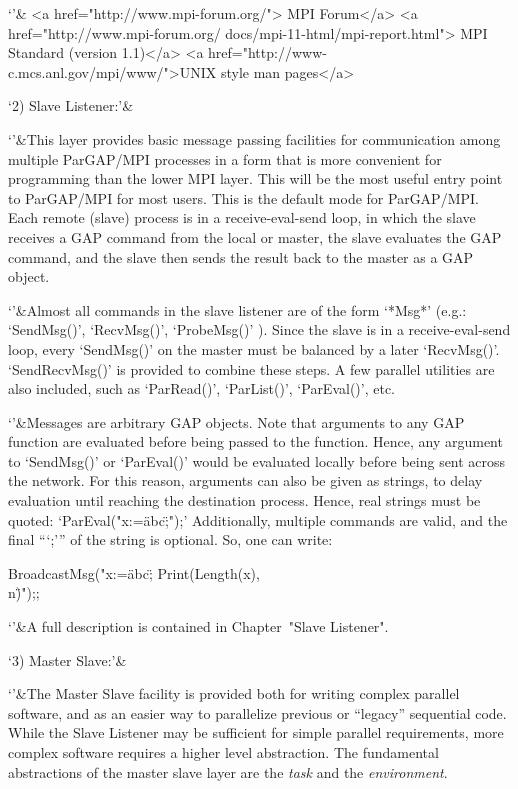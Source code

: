 `'&\begintt
   <a href="http://www.mpi-forum.org/"> MPI Forum</a>
   <a href="http://www.mpi-forum.org/
           docs/mpi-11-html/mpi-report.html">
      MPI Standard (version 1.1)</a>
   <a href="http://www-c.mcs.anl.gov/mpi/www/">UNIX style man pages</a>
\endtt

`2) Slave Listener:'&

`'&This layer provides basic message passing facilities for
   communication among multiple ParGAP/MPI processes in a form that is
   more convenient for programming than the lower MPI layer.  This
   will be the most useful entry point to ParGAP/MPI for most users.
   This is the default mode for ParGAP/MPI.  Each remote (slave) process
   is in a receive-eval-send loop, in which the slave receives a GAP
   command from the local or master, the slave evaluates the GAP
   command, and the slave then sends the result back to the master as
   a GAP object.

`'&Almost all commands in the slave listener are of the form
   `*Msg*' (e.g.: `SendMsg()', `RecvMsg()',
   `ProbeMsg()' ).  Since the slave is in a receive-eval-send
   loop, every `SendMsg()' on the master must be balanced by a
   later `RecvMsg()'. `SendRecvMsg()' is provided to combine
   these steps.  A few parallel utilities are also included, such as
   `ParRead()', `ParList()', `ParEval()', etc.

`'&Messages are arbitrary GAP objects.  Note that arguments to any GAP
   function are evaluated before being passed to the function.  Hence,
   any argument to `SendMsg()' or `ParEval()' would be
   evaluated locally before being sent across the network.  For this
   reason, arguments can also be given as strings, to delay evaluation
   until reaching the destination process.  Hence, real strings must
   be quoted: `ParEval("x:=\"abc\";");' Additionally, multiple
   commands are valid, and the final ```;''' of the string is
   optional.  So, one can write:

\begintt
       BroadcastMsg("x:=\"abc\"; Print(Length(x), \"\\n\")");;
\endtt

`'&A full description is contained in Chapter~"Slave Listener".

`3) Master Slave:'&

`'&The Master Slave facility is provided both for writing complex
   parallel software, and as an easier way to parallelize previous or
   ``legacy'' sequential code.  While the Slave Listener may be
   sufficient for simple parallel requirements, more complex software
   requires a higher level abstraction.  The fundamental abstractions
   of the master slave layer are the {\it task} and the {\it environment}.

